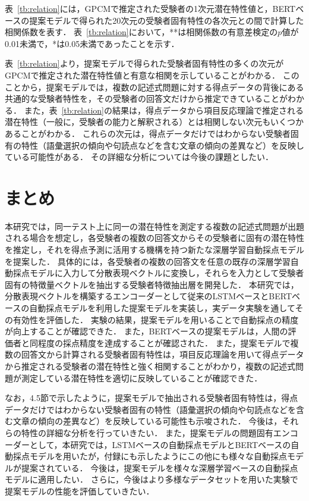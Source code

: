 \documentclass[a4paper,12pt,oneside,openany]{jsbook}
\begin{document}
表~\ref{tb:relation}には，GPCMで推定された受験者の1次元潜在特性値と，BERTベースの提案モデルで得られた20次元の受験者固有特性の各次元との間で計算した相関係数を表す．
表~\ref{tb:relation}において，**は相関係数の有意差検定の$p$値が0.01未満で，*は0.05未満であったことを示す．

表~\ref{tb:relation}より，提案モデルで得られた受験者固有特性の多くの次元がGPCMで推定された潜在特性値と有意な相関を示していることがわかる．
このことから，提案モデルでは，複数の記述式問題に対する得点データの背後にある共通的な受験者特性を，その受験者の回答文だけから推定できていることがわかる．
また，表~\ref{tb:relation}の結果は，得点データから項目反応理論で推定される潜在特性（一般に，受験者の能力と解釈される）とは相関しない次元もいくつかあることがわかる．
これらの次元は，得点データだけではわからない受験者固有の特性（語彙選択の傾向や句読点などを含む文章の傾向の差異など）を反映している可能性がある．
その詳細な分析については今後の課題としたい．

\chapter{まとめ}

本研究では，同一テスト上に同一の潜在特性を測定する複数の記述式問題が出題される場合を想定し，各受験者の複数の回答文からその受験者に固有の潜在特性を推定し，それを得点予測に活用する機構を持つ新たな深層学習自動採点モデルを提案した．
具体的には，各受験者の複数の回答文を任意の既存の深層学習自動採点モデルに入力して分散表現ベクトルに変換し，それらを入力として受験者固有の特徴量ベクトルを抽出する受験者特徴抽出層を開発した．
本研究では，分散表現ベクトルを構築するエンコーダーとして従来のLSTMベースとBERTベースの自動採点モデルを利用した提案モデルを実装し，実データ実験を通してその有効性を評価した．
実験の結果，提案モデルを用いることで自動採点の精度が向上することが確認できた．
また，BERTベースの提案モデルは，人間の評価者と同程度の採点精度を達成することが確認された．
また，提案モデルで複数の回答文から計算される受験者固有特性は，項目反応理論を用いて得点データから推定される受験者の潜在特性と強く相関することがわかり，複数の記述式問題が測定している潜在特性を適切に反映していることが確認できた．

なお，4.5節で示したように，提案モデルで抽出される受験者固有特性は，得点データだけではわからない受験者固有の特性（語彙選択の傾向や句読点などを含む文章の傾向の差異など）を反映している可能性も示唆された．
今後は，それらの特性の詳細な分析を行っていきたい．
また，提案モデルの問題固有エンコーダーとして，本研究では，LSTMベースの自動採点モデルとBERTベースの自動採点モデルを用いたが，付録にも示したようにこの他にも様々な自動採点モデルが提案されている．
今後は，提案モデルを様々な深層学習ベースの自動採点モデルに適用したい．
さらに，今後はより多様なデータセットを用いた実験で提案モデルの性能を評価していきたい．
\end{document}
